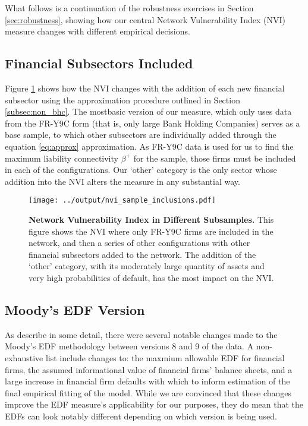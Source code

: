 What follows is a continuation of the robustness exercises in Section \ref{sec:robustness}, showing how our central Network Vulnerability Index (NVI) measure changes with different empirical decisions. 

\subsection*{Financial Subsectors Included}

Figure \ref{fig:NVI_subsectors} shows how the NVI changes with the addition of each new financial subsector using the approximation procedure outlined in Section \ref{subsec:non_bhc}. The mostbasic version of our measure, which only uses data from the FR-Y9C form (that is, only large Bank Holding Companies) serves as a base sample, to which other subsectors are individually added through the equation \ref{eq:approx} approximation. As FR-Y9C data is used for us to find the maximum liability connectivity $\beta^+$ for the sample, those firms must be included in each of the configurations. Our `other' category is the only sector whose addition into the NVI alters the measure in any substantial way.

\begin{figure}[H] 
\begin{center}
\texttt{[image: ../output/nvi\_sample\_inclusions.pdf]}
\end{center}
\caption[]{\textbf{Network Vulnerability Index in Different Subsamples.} This figure shows the NVI where only FR-Y9C firms are included in the network, and then a series of other configurations with other financial subsectors added to the network. The addition of the `other' category, with its moderately large quantity of assets and very high probabilities of default, has the most impact on the NVI.} \label{fig:NVI_subsectors}
\end{figure}

\subsection*{Moody's EDF Version}

As \citet{kmv_methods} describe in some detail, there were several notable changes made to the Moody's EDF methodology between versions 8 and 9 of the data. A non-exhaustive list include changes to: the maxmium allowable EDF for financial firms, the assumed informational value of financial firms' balance sheets, and a large increase in financial firm defaults with which to inform estimation of the final empirical fitting of the model. While we are convinced that these changes improve the EDF measure's applicability for our purposes, they do mean that the EDFs can look notably different depending on which version is being used. 

